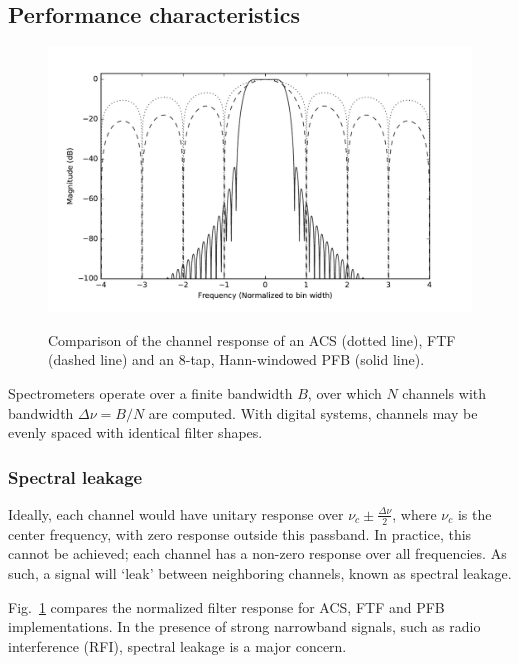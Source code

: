 \documentclass{ws-rv961x669}
\begin{document}
\subsection{Performance characteristics}

\begin{figure}
 \centering
 \includegraphics[width=\textwidth]{./figures/fb_comparison}
 \label{fig:pfb_response}
 \caption{Comparison of the channel response of an ACS (dotted line), FTF (dashed line) and an 8-tap, Hann-windowed PFB (solid line).\label{fig:leakage}}
\end{figure}

Spectrometers operate over a finite bandwidth $B$, over which $N$ channels with bandwidth $\Delta\nu = B/N$ are computed.  With digital systems, channels may be evenly spaced with identical filter shapes. 

\subsubsection{Spectral leakage}

Ideally, each channel would have unitary response over $\nu_c \pm \frac{\Delta\nu}{2}$, where $\nu_c$ is the center frequency, with zero response outside this passband. In practice, this cannot be achieved; each channel has a non-zero response over all frequencies.  As such, a signal will `leak' between neighboring channels, known as spectral leakage.

Fig.~\ref{fig:leakage} compares the normalized filter response for ACS, FTF and PFB implementations. In the presence of strong narrowband signals, such as radio interference (RFI), spectral leakage is a major concern.
\end{document}
